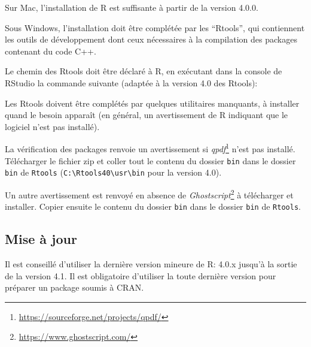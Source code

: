 \documentclass[
  11pt,
  french,
  a4paper,
  extrafontsizes,onecolumn,openright
  ]{memoir}
\newenvironment{Shaded}{\begin{snugshade}}{\end{snugshade}}
\newcommand{\AttributeTok}[1]{\textcolor[rgb]{0.77,0.63,0.00}{#1}}
\newcommand{\CommentTok}[1]{\textcolor[rgb]{0.56,0.35,0.01}{\textit{#1}}}
\newcommand{\FunctionTok}[1]{\textcolor[rgb]{0.00,0.00,0.00}{#1}}
\newcommand{\NormalTok}[1]{#1}
\newcommand{\SpecialCharTok}[1]{\textcolor[rgb]{0.00,0.00,0.00}{#1}}
\newcommand{\StringTok}[1]{\textcolor[rgb]{0.31,0.60,0.02}{#1}}
\begin{document}
Sur Mac, l'installation de R est suffisante à partir de la version 4.0.0.

Sous Windows, l'installation doit être complétée par les ``Rtools'', qui contiennent les outils de développement dont ceux nécessaires à la compilation des packages contenant du code C++.

Le chemin des Rtools doit être déclaré à R, en exécutant dans la console de RStudio la commande suivante (adaptée à la version 4.0 des Rtools):

\scriptsize

\begin{Shaded}
\end{Shaded}

\normalsize

Les Rtools doivent être complétés par quelques utilitaires manquants, à installer quand le besoin apparaît (en général, un avertissement de R indiquant que le logiciel n'est pas installé).

La vérification des packages renvoie un avertissement si \emph{qpdf}\footnote{\url{https://sourceforge.net/projects/qpdf/}} n'est pas installé.
Télécharger le fichier zip et coller tout le contenu du dossier \texttt{bin} dans le dossier \texttt{bin} de \texttt{Rtools} (\texttt{C:\textbackslash{}Rtools40\textbackslash{}usr\textbackslash{}bin} pour la version 4.0).

Un autre avertissement est renvoyé en absence de \emph{Ghostscript}\footnote{\url{https://www.ghostscript.com/}} à télécharger et installer.
Copier ensuite le contenu du dossier \texttt{bin} dans le dossier \texttt{bin} de \texttt{Rtools}.

\hypertarget{mise-uxe0-jour}{%
\subsection{Mise à jour}\label{mise-uxe0-jour}}

Il est conseillé d'utiliser la dernière version mineure de R: 4.0.x jusqu'à la sortie de la version 4.1.
Il est obligatoire d'utiliser la toute dernière version pour préparer un package soumis à CRAN.
\end{document}
